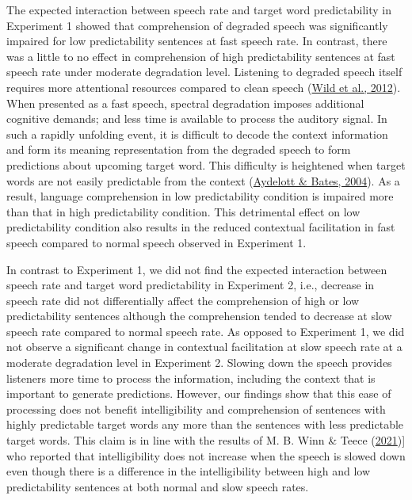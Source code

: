 \documentclass[a4paper, nobind]{templates/ociamthesis}
\begin{document}
The expected interaction between speech rate and target word predictability in Experiment 1 showed that comprehension of degraded speech was significantly impaired for low predictability sentences at fast speech rate. In contrast, there was a little to no effect in comprehension of high predictability sentences at fast speech rate under moderate degradation level.
Listening to degraded speech itself requires more attentional resources compared to clean speech (\protect\hyperlink{ref-Wild2012}{Wild et al., 2012}).
When presented as a fast speech, spectral degradation imposes additional cognitive demands; and less time is available to process the auditory signal.
In such a rapidly unfolding event, it is difficult to decode the context information and form its meaning representation from the degraded speech to form predictions about upcoming target word.
This difficulty is heightened when target words are not easily predictable from the context (\protect\hyperlink{ref-Aydelott2004}{Aydelott \& Bates, 2004}).
As a result, language comprehension in low predictability condition is impaired more than that in high predictability condition.
This detrimental effect on low predictability condition also results in the reduced contextual facilitation in fast speech compared to normal speech observed in Experiment 1.

In contrast to Experiment 1, we did not find the expected interaction between speech rate and target word predictability in Experiment 2,
i.e., decrease in speech rate did not differentially affect the comprehension of high or low predictability sentences although the comprehension tended to decrease at slow speech rate compared to normal speech rate.
As opposed to Experiment 1, we did not observe a significant change in contextual facilitation at slow speech rate at a moderate degradation level in Experiment 2.
Slowing down the speech provides listeners more time to process the information, including the context that is important to generate predictions.
However, our findings show that this ease of processing does not benefit intelligibility and comprehension of sentences with highly predictable target words any more than the sentences with less predictable target words.
This claim is in line with the results of M. B. Winn \& Teece (\protect\hyperlink{ref-Winn2021b}{2021}){]} who reported that intelligibility does not increase when the speech is slowed down even though there is a difference in the intelligibility between high and low predictability sentences at both normal and slow speech rates.
\end{document}
